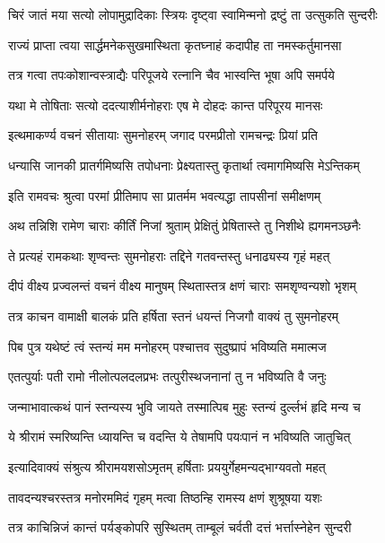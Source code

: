 \twolineshloka
{चिरं जातं मया सत्यो लोपामुद्रादिकाः स्त्रियः}
{दृष्ट्वा स्वामिन्मनो द्रष्टुं ता उत्सुकति सुन्दरीः}%

\twolineshloka
{राज्यं प्राप्ता त्वया सार्द्धमनेकसुखमास्थिता}
{कृतघ्नाहं कदापीह ता नमस्कर्तुमानसा}%

\twolineshloka
{तत्र गत्वा तपःकोशान्वस्त्राद्यैः परिपूजये}
{रत्नानि चैव भास्वन्ति भूषा अपि समर्पये}%

\twolineshloka
{यथा मे तोषिताः सत्यो ददत्याशीर्मनोहराः}
{एष मे दोहदः कान्त परिपूरय मानसः}%

\twolineshloka
{इत्थमाकर्ण्य वचनं सीतायाः सुमनोहरम्}
{जगाद परमप्रीतो रामचन्द्रः प्रियां प्रति}%

\twolineshloka
{धन्यासि जानकी प्रातर्गमिष्यसि तपोधनाः}
{प्रेक्ष्यतास्तु कृतार्था त्वमागमिष्यसि मेऽन्तिकम्}%

\twolineshloka
{इति रामवचः श्रुत्वा परमां प्रीतिमाप सा}
{प्रातर्मम भवत्यद्धा तापसीनां समीक्षणम्}%

\twolineshloka
{अथ तन्निशि रामेण चाराः कीर्तिं निजां श्रुताम्}
{प्रेक्षितुं प्रेषितास्ते तु निशीथे ह्यगमनञ्छनैः}%

\twolineshloka
{ते प्रत्यहं रामकथाः शृण्वन्तः सुमनोहराः}
{तद्दिने गतवन्तस्तु धनाढ्यस्य गृहं महत्}%

\twolineshloka
{दीपं वीक्ष्य प्रज्वलन्तं वचनं वीक्ष्य मानुषम्}
{स्थितास्तत्र क्षणं चाराः समशृण्वन्यशो भृशम्}%

\twolineshloka
{तत्र काचन वामाक्षी बालकं प्रति हर्षिता}
{स्तनं धयन्तं निजगौ वाक्यं तु सुमनोहरम्}%

\twolineshloka
{पिब पुत्र यथेष्टं त्वं स्तन्यं मम मनोहरम्}
{पश्चात्तव सुदुष्प्रापं भविष्यति ममात्मज}%

\twolineshloka
{एतत्पुर्याः पती रामो नीलोत्पलदलप्रभः}
{तत्पुरीस्थजनानां तु न भविष्यति वै जनुः}%

\twolineshloka
{जन्माभावात्कथं पानं स्तन्यस्य भुवि जायते}
{तस्मात्पिब मुहुः स्तन्यं दुर्ल्लभं हृदि मन्य च}%

\twolineshloka
{ये श्रीरामं स्मरिष्यन्ति ध्यायन्ति च वदन्ति ये}
{तेषामपि पयःपानं न भविष्यति जातुचित्}%

\twolineshloka
{इत्यादिवाक्यं संश्रुत्य श्रीरामयशसोऽमृतम्}
{हर्षिताः प्रययुर्गेहमन्यद्भाग्यवतो महत्}%

\twolineshloka
{तावदन्यश्चरस्तत्र मनोरममिदं गृहम्}
{मत्वा तिष्ठन्हि रामस्य क्षणं शुश्रूषया यशः}%

\twolineshloka
{तत्र काचिन्निजं कान्तं पर्यङ्कोपरि सुस्थितम्}
{ताम्बूलं चर्वती दत्तं भर्त्तास्नेहेन सुन्दरी}%

